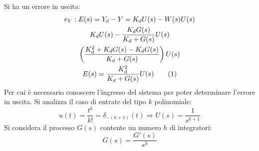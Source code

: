 \documentclass{article}
\numberwithin{equation}{subsection}
\newcommand{\df}{\mathrm{d}}
\newcommand{\tageq}{\tag{\stepcounter{equation}\theequation}}
\begin{document}
Si ha un errore in uscita:
\begin{gather*}
    e_Y:E(s)=Y_d-Y=K_dU(s)-W(s)U(s)\\
    K_dU(s)-\displaystyle\frac{K_dG(s)}{K_d+G(s)}U(s)\\
    \left(\displaystyle\frac{K_\df^2+K_dG(s)-K_dG(s)}{K_d+G(s)}\right)U(s)\\
    E(s)=\displaystyle\frac{K_\df^2}{K_d+G(s)}U(s)\tageq
\end{gather*}
Per cui è necessario conoscere l'ingresso del sistema per poter determinare l'errore in uscita. Si analizza il caso di entrate del tipo $k$ polinomiale: 
\begin{equation*}
    u(t)=\displaystyle\frac{t^k}{k!}=\delta_{-(k+1)}(t)\Rightarrow U(s)=\displaystyle\frac{1}{s^{k+1}}
\end{equation*}
Si considera il processo $G(s)$ contente un numero $h$ di integratori:
\begin{equation*}
    G(s)=\displaystyle\frac{G'(s)}{s^h}
\end{equation*}
\end{document}
